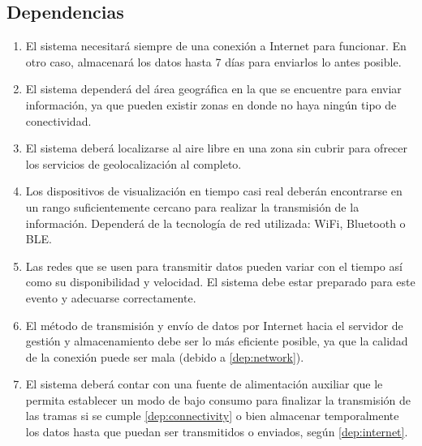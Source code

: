 \subsection*{Dependencias}
\begin{enumerate}[label=\textbf{\texttt{DEP-\arabic*}}]
  \item\label{dep:internet} El sistema necesitará siempre de una conexión a Internet para funcionar.
        En otro caso, almacenará los datos hasta 7 días para enviarlos lo antes
        posible.
  \item\label{dep:connectivity} El sistema dependerá del área geográfica en la que se encuentre para enviar
        información, ya que pueden existir zonas en donde no haya ningún tipo de
        conectividad.
  \item\label{dep:gps} El sistema deberá localizarse al aire libre en una zona sin cubrir para
        ofrecer los servicios de geolocalización al completo.
  \item\label{dep:rt} Los dispositivos de visualización en tiempo casi real deberán encontrarse
        en un rango suficientemente cercano para realizar la transmisión de la
        información. Dependerá de la tecnología de red utilizada:
        WiFi, Bluetooth o \ac{BLE}.
  \item\label{dep:network} Las redes que se usen para transmitir datos pueden variar con el tiempo
        así como su disponibilidad y velocidad. El sistema debe estar preparado
        para este evento y adecuarse correctamente.
  \item\label{dep:nt-speed} El método de transmisión y envío de datos por Internet hacia el servidor
        de gestión y almacenamiento debe ser lo más eficiente posible, ya que la
        calidad de la conexión puede ser mala (debido a \ref{dep:network}).
  \item\label{dep:battery} El sistema deberá contar con una fuente de alimentación
        auxiliar que le permita establecer un modo de bajo consumo para finalizar
        la transmisión de las tramas si se cumple \ref{dep:connectivity} o bien
        almacenar temporalmente los datos hasta que puedan ser transmitidos o enviados,
        según \ref{dep:internet}.
\end{enumerate}

